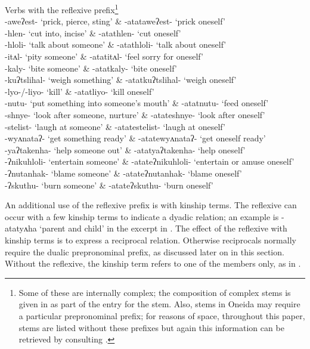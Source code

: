 \documentclass[output=paper]{langscibook}
\begin{document}
\ea%
\label{ex:oneida:13}Verbs with the reflexive prefix\footnote{Some of these are inter\-nally complex; the composition of complex stems is given in \citet{MichelsonDoxtator2002} as part of the entry for the stem. Also, stems in Oneida may require a particular prepronominal prefix; for reasons of space, throughout this paper, stems are listed without these prefixes but again this information can be retrieved by consulting \citet{MichelsonDoxtator2002}.}\\          
{{}-aweʔest-} ‘prick, pierce, sting’ \&  {{}-atataweʔest-} ‘prick oneself’\\
{-hlen-} ‘cut into, incise’ \&  {-atathlen-} ‘cut oneself’\\
{{}-hloli-} ‘talk about someone’ \&  {{}-atathloli-} ‘talk about oneself’\\
{-itʌl-} ‘pity someone’ \&  {-atatitʌl-} ‘feel sorry for oneself’\\
{{}-kaly-} ‘bite someone’ \&  {{}-atatkaly-} ‘bite oneself’\\
{-kuʔtslihal-} ‘weigh something’ \&  {-atatkuʔtslihal-} ‘weigh oneself’\\
{-lyo-/-liyo-} ‘kill’ \&  {-atatliyo-} ‘kill oneself’\\
{-nutu-} ‘put something into someone’s mouth’ \&  {-atatnutu-} ‘feed oneself’\\
{-shnye-} ‘look after someone, nurture’ \&  {-atateshnye-} ‘look after oneself’\\
{-stelist-} ‘laugh at someone’ \&  {-atatestelist-} ‘laugh at oneself’\\
{-wyʌnataʔ-} ‘get something ready’ \& {-atatewyʌnataʔ-} ‘get oneself ready’\\
{-yaʔtakenha-} ‘help someone out’ \&  {-atatyaʔtakenha-} ‘help oneself’\\
{-ʔnikuhloli-} ‘entertain someone’ \&  {-atateʔnikuhloli-} ‘entertain or amuse oneself’\\
{-ʔnutanhak-} ‘blame someone’ \&  {-atateʔnutanhak-} ‘blame oneself’\\
{-ʔskuthu-} ‘burn someone’ \&  {-atateʔskuthu-} ‘burn oneself’

\z

An additional use of the reflexive prefix is with kinship terms. The reflexive can occur with a few kinship terms to indicate a dyadic relation; an ex\-ample is {{}-atatyʌha} ‘parent and child’ in the excerpt in . The effect of the reflexive with kinship terms is to express a reciprocal relation. Otherwise reciprocals normally require the dualic prepronominal prefix, as discussed later on in this section. Without the reflexive, the kinship term refers to one of the members only, as in .
\end{document}
